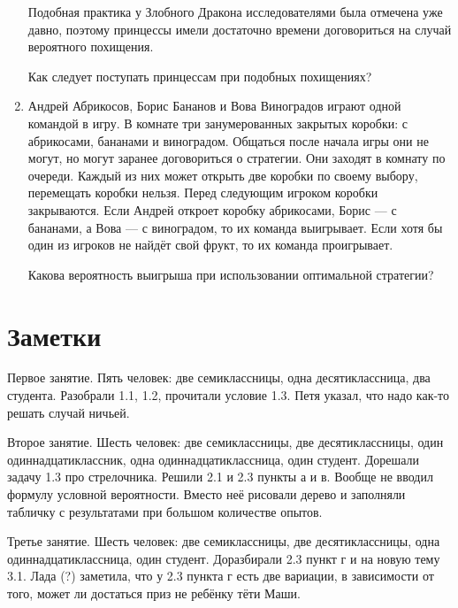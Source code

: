 \documentclass[12pt]{article}
\begin{document}
\begin{enumerate}
Подобная практика у Злобного Дракона исследователями была отмечена уже давно,
поэтому принцессы имели достаточно времени договориться на случай вероятного похищения.

Как следует поступать принцессам при подобных похищениях?

\item Андрей Абрикосов, Борис Бананов и Вова Виноградов играют одной командой в игру.
В комнате три занумерованных закрытых коробки: с абрикосами, бананами и виноградом.
Общаться после начала игры они не могут, но могут заранее договориться о стратегии.
Они заходят в комнату по очереди.
Каждый из них может открыть две коробки по своему выбору, перемещать коробки нельзя.
Перед следующим игроком коробки закрываются. Если Андрей откроет коробку абрикосами,
Борис — с бананами, а Вова — с виноградом, то их команда выигрывает.
Если хотя бы один из игроков не найдёт свой фрукт, то их команда проигрывает.

Какова вероятность выигрыша при использовании оптимальной стратегии?

\end{enumerate}

\newpage
\section{Заметки}

Первое занятие. Пять человек: две семиклассницы, одна десятиклассница, два студента. 
Разобрали 1.1, 1.2, прочитали условие 1.3. 
Петя указал, что надо как-то решать случай ничьей.

Второе занятие. Шесть человек: две семиклассницы, две десятиклассницы, один одиннадцатиклассник, одна одиннадцатиклассница,
один студент. 
Дорешали задачу 1.3 про стрелочника. 
Решили 2.1 и 2.3 пункты а и в. 
Вообще не вводил формулу условной вероятности. 
Вместо неё рисовали дерево и заполняли табличку с результатами при большом количестве опытов. 

Третье занятие. Шесть человек: две семиклассницы, две десятиклассницы, одна одиннадцатиклассница,
один студент. Доразбирали 2.3 пункт г и на новую тему 3.1.
Лада (?) заметила, что у 2.3 пункта г есть две вариации, в зависимости от того, 
может ли достаться приз не ребёнку тёти Маши. 
\end{document}
